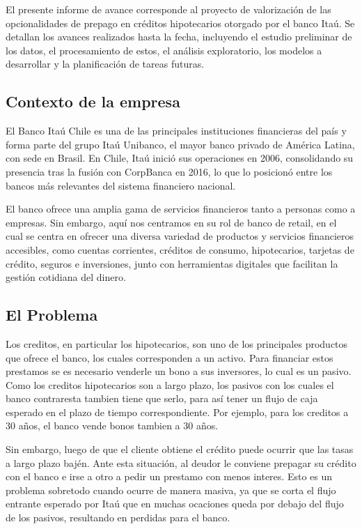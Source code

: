 \qquad El presente informe de avance corresponde al proyecto de valorización de las opcionalidades de prepago en créditos hipotecarios otorgado por el banco Itaú. Se detallan los avances realizados hasta la fecha, incluyendo el estudio preliminar de los datos, el procesamiento de estos, el análisis exploratorio, los modelos a desarrollar y la planificación de tareas futuras.

\subsection{Contexto de la empresa}

\qquad El Banco Itaú Chile es una de las principales instituciones financieras del país y forma parte del grupo Itaú Unibanco, el mayor banco privado de América Latina, con sede en Brasil. En Chile, Itaú inició sus operaciones en 2006, consolidando su presencia tras la fusión con CorpBanca en 2016, lo que lo posicionó entre los bancos más relevantes del sistema financiero nacional.

\qquad El banco ofrece una amplia gama de servicios financieros tanto a personas como a empresas. Sin embargo, aquí nos centramos en su rol de banco de retail, en el cual se centra en ofrecer una diversa variedad de productos y servicios financieros accesibles, como cuentas corrientes, créditos de consumo, hipotecarios, tarjetas de crédito, seguros e inversiones, junto con herramientas digitales que facilitan la gestión cotidiana del dinero.

\subsection{El Problema}

\qquad Los creditos, en particular los hipotecarios, son uno de los principales productos que ofrece el banco, los cuales corresponden a un activo. Para financiar estos prestamos se es necesario venderle un bono a sus inversores, lo cual es un pasivo. Como los creditos hipotecarios son a largo plazo, los pasivos con los cuales el banco contraresta tambien tiene que serlo, para así tener un flujo de caja esperado en el plazo de tiempo correspondiente. Por ejemplo, para los creditos a 30 años, el banco vende bonos tambien a 30 años.

\qquad Sin embargo, luego de que el cliente obtiene el crédito puede ocurrir que las tasas a largo plazo bajén. Ante esta situación, al deudor le conviene prepagar su crédito con el banco e irse a otro a pedir un prestamo con menos interes. Esto es un problema sobretodo cuando ocurre de manera masiva, ya que se corta el flujo entrante esperado por Itaú que en muchas ocaciones queda por debajo del flujo de los pasivos, resultando en perdidas para el banco.

